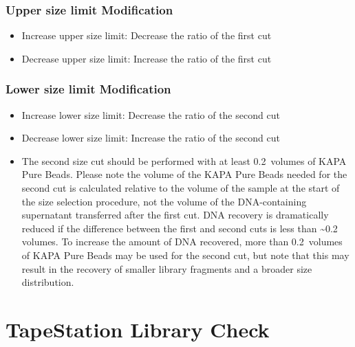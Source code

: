 \documentclass[
  letterpaper,
  DIV=11,
  numbers=noendperiod]{scrreprt}
\begin{document}
\hypertarget{upper-size-limit-modification}{%
\subsection*{\texorpdfstring{\textbf{Upper size limit \textbar{}
Modification}}{Upper size limit \textbar{} Modification}}\label{upper-size-limit-modification}}

\begin{itemize}
\item
  Increase upper size limit: Decrease the ratio of the first cut
\item
  Decrease upper size limit: Increase the ratio of the first cut
\end{itemize}

\hypertarget{lower-size-limit-modification}{%
\subsection*{\texorpdfstring{\textbf{Lower size limit \textbar{}
Modification}}{Lower size limit \textbar{} Modification}}\label{lower-size-limit-modification}}

\begin{itemize}
\item
  Increase lower size limit: Decrease the ratio of the second cut
\item
  Decrease lower size limit: Increase the ratio of the second cut
\item
  The second size cut should be performed with at least 0.2~volumes of
  KAPA Pure Beads. Please note the volume of the KAPA Pure Beads needed
  for the second cut is calculated relative to the volume of the sample
  at the start of the size selection procedure, not the volume of the
  DNA-containing supernatant transferred after the first cut. DNA
  recovery is dramatically reduced if the difference between the first
  and second cuts is less than \textasciitilde0.2~ volumes. To increase
  the amount of DNA recovered, more than 0.2~volumes of KAPA Pure Beads
  may be used for the second cut, but note that this may result in the
  recovery of smaller library fragments and a broader size distribution.
\end{itemize}

\hypertarget{tapestation-library-check}{%
\chapter{TapeStation Library Check}\label{tapestation-library-check}}
\end{document}
